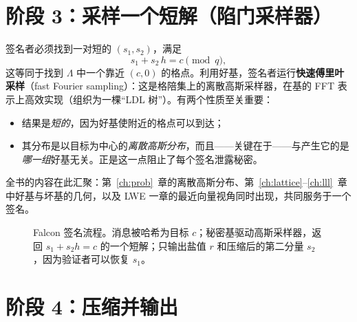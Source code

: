 \section{阶段 3：采样一个短解（陷门采样器）}
\label{sec:falcon-tree-note}

签名者必须找到一对短的 $(s_1, s_2)$，满足
\[
s_1 + s_2\,h = c \pmod q,
\]
这等同于找到 $\Lambda$ 中一个靠近 $(c, 0)$ 的格点。利用好基，签名者运行\textbf{快速傅里叶采样}（fast Fourier sampling）：这是格陪集上的离散高斯采样器，在基的 FFT 表示上高效实现（组织为一棵“LDL 树”）。有两个性质至关重要：

\begin{itemize}
  \item 结果是\emph{短的}，因为好基使附近的格点可以到达；
  \item 其分布是以目标为中心的\emph{离散高斯分布}，而且——关键在于——与产生它的是\emph{哪一组}好基无关。正是这一点阻止了每个签名泄露秘密。
\end{itemize}

全书的内容在此汇聚：第~\ref{ch:prob}~章的离散高斯分布、第~\ref{ch:lattice}--\ref{ch:lll}~章中好基与坏基的几何，以及 LWE 一章的最近向量视角同时出现，共同服务于一个签名。

\begin{figure}[H]
\centering
{}
\caption{Falcon 签名流程。消息被哈希为目标 $c$；秘密基驱动高斯采样器，返回 $s_1+s_2h=c$ 的一个短解；只输出盐值 $r$ 和压缩后的第二分量 $s_2$，因为验证者可以恢复 $s_1$。}
\label{fig:falcon-sign}
\end{figure}

\section{阶段 4：压缩并输出}

